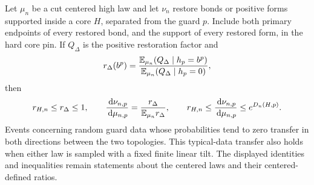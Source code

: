 \begin{lemma}
\label{lem:restoration}
Let \(\mu_n\) be a cut centered high law and let
\(\nu_n\) restore bonds or positive forms supported
inside a core \(H\), separated from the guard \(p\).
Include both primary endpoints of every restored
bond, and the support of every restored form, in
the hard core pin. If \(Q_\Delta\) is the positive
restoration factor and
\[
 r_\Delta(b^p)=
 \frac{\mathbb E_{\mu_n}(Q_\Delta\mid h_p=b^p)}
      {\mathbb E_{\mu_n}(Q_\Delta\mid h_p=0)},
\]
then
\begin{equation}
 r_{H,n}\le r_\Delta\le1,\qquad
 \frac{\,\mathrm d\nu_{n,p}}{\,\mathrm d\mu_{n,p}}
   =\frac{r_\Delta}{\mathbb E_{\mu_n}r_\Delta},\qquad
 r_{H,n}\le\frac{\,\mathrm d\nu_{n,p}}{\,\mathrm d\mu_{n,p}}
                  \le e^{D_n(H,p)}.
 \label{eq:pins-restoration}
\end{equation}
Events concerning random guard data whose probabilities
tend to zero transfer in both directions between
the two topologies. This typical-data transfer also
holds when either law is sampled with a fixed finite
linear tilt. The displayed identities and inequalities
remain statements about the centered laws and their
centered-defined ratios.
\end{lemma}

